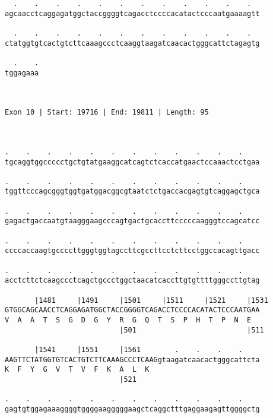 \documentclass{article}
\begin{document}
\begin{Verbatim}
  .    .    .    .    .    .    .    .    .    .    .    .  
agcaacctcaggagatggctaccggggtcagacctccccacatactcccaatgaaaagtt
                                                            
  .    .    .    .    .    .    .    .    .    .    .    .  
ctatggtgtcactgtcttcaaagccctcaaggtaagatcaacactgggcattctagagtg
                                                            
  .    .
tggagaaa
        
        
 
Exon 10 | Start: 19716 | End: 19811 | Length: 95



.    .    .    .    .    .    .    .    .    .    .    .    
tgcaggtggccccctgctgtatgaaggcatcagtctcaccatgaactccaaactcctgaa
                                                            
.    .    .    .    .    .    .    .    .    .    .    .    
tggttcccagcgggtggtgatggacggcgtaatctctgaccacgagtgtcaggagctgca
                                                            
.    .    .    .    .    .    .    .    .    .    .    .    
gagactgaccaatgtaagggaagcccagtgactgcaccttcccccaagggtccagcatcc
                                                            
.    .    .    .    .    .    .    .    .    .    .    .    
ccccaccaagtgccccttgggtggtagccttcgccttcctcttcctggccacagttgacc
                                                            
.    .    .    .    .    .    .    .    .    .    .    .    
acctcttctcaagccctcagctgccctggctaacatcaccttgtgttttgggccttgtag
                                                            
       |1481     |1491     |1501     |1511     |1521     |1531
GTGGCAGCAACCTCAGGAGATGGCTACCGGGGTCAGACCTCCCCACATACTCCCAATGAA
V  A  A  T  S  G  D  G  Y  R  G  Q  T  S  P  H  T  P  N  E  
                           |501                          |511
  
       |1541     |1551     |1561        .    .    .    .    
AAGTTCTATGGTGTCACTGTCTTCAAAGCCCTCAAGgtaagatcaacactgggcattcta
K  F  Y  G  V  T  V  F  K  A  L  K                          
                           |521                             
  
.    .    .    .    .    .    .    .    .    .    .    .    
gagtgtggagaaaggggtggggaagggggaagctcaggctttgaggaagagttggggctg
                                                            

\end{Verbatim}
\end{document}
